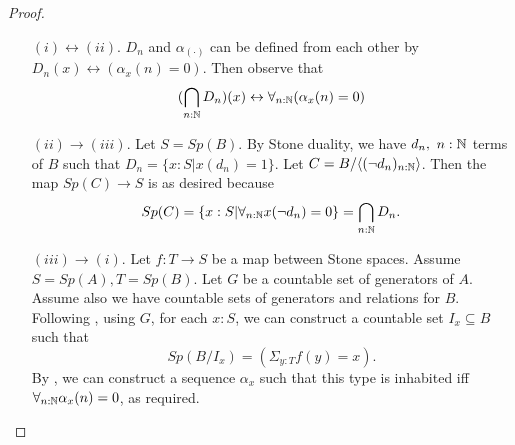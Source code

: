 \begin{proof}
\item 
  \begin{itemize}
  \item[$(i)\leftrightarrow (ii)$.] 
    $D_n$ and $\alpha_{(\cdot)}$ can be defined from each other by 
     $D_n(x) \leftrightarrow (\alpha_x(n) = 0)$. Then observe that %
     \begin{equation}
      (\bigcap_{n:\mathbb{N}} D_n) (x) \leftrightarrow 
      \forall_{n:\mathbb N} (\alpha_x(n) = 0) 
     \end{equation}
   \item[$(ii) \to (iii)$.]
      Let $S=Sp(B)$. 
      By Stone duality, we have $d_n,~n:\mathbb{N}$ terms of $B$ such that $D_n = \{x:S| x(d_n) = 1\}$. 
      Let $C = B/\langle (\neg d_n)_{n:\mathbb{N}}\rangle$.
      Then the map $Sp(C) \to S$ is as desired because
      $$Sp(C) = \{x:S| \forall_{n:\mathbb{N}} x(\neg d_n) =0\}  = \bigcap_{n:\mathbb{N}} D_n.$$
   \item[$(iii) \to (i)$.] 
      Let $f:T\to S$ be a map between Stone spaces. 
      Assume $S = Sp(A), T = Sp (B)$. 
%
      Let $G$ be a countable set of generators of $A$. 
      Assume also we have countable sets of generators and relations for $B$. 
%
      Following , using $G$, for each $x:S$, we can construct 
      a countable set $I_x\subseteq B$ such that $$Sp(B/I_x) = (\Sigma_{y:T} f(y) = x) .$$
      By , we can construct a sequence 
      $\alpha_x$ such that this type is inhabited iff $\forall_{n:\mathbb{N}} \alpha_x(n) = 0$,
      as required. 
%

\end{itemize}
\end{proof}
